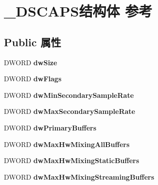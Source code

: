 \hypertarget{struct___d_s_c_a_p_s}{}\section{\+\_\+\+D\+S\+C\+A\+P\+S结构体 参考}
\label{struct___d_s_c_a_p_s}
\subsection*{Public 属性}
\begin{DoxyCompactItemize}
\item 
\mbox{\label{struct___d_s_c_a_p_s_acf5a8360a23ad3d2eb524d1cba1df331}} 
D\+W\+O\+RD {\bfseries dw\+Size}
\item 
\mbox{\label{struct___d_s_c_a_p_s_a06c7cb064cb8ec0e0dacb0757ada8b91}} 
D\+W\+O\+RD {\bfseries dw\+Flags}
\item 
\mbox{\label{struct___d_s_c_a_p_s_aa274d8c589981cf49dea4fcebbeb8398}} 
D\+W\+O\+RD {\bfseries dw\+Min\+Secondary\+Sample\+Rate}
\item 
\mbox{\label{struct___d_s_c_a_p_s_a3ab6dfd8a659338b0d6f871c5bfac77d}} 
D\+W\+O\+RD {\bfseries dw\+Max\+Secondary\+Sample\+Rate}
\item 
\mbox{\label{struct___d_s_c_a_p_s_a2cd5675747f68712d4851795b03b2ee8}} 
D\+W\+O\+RD {\bfseries dw\+Primary\+Buffers}
\item 
\mbox{\label{struct___d_s_c_a_p_s_aa76c898aabb19fb791def4a9e875c074}} 
D\+W\+O\+RD {\bfseries dw\+Max\+Hw\+Mixing\+All\+Buffers}
\item 
\mbox{\label{struct___d_s_c_a_p_s_ac7996b0871403cbedeafa3769130d951}} 
D\+W\+O\+RD {\bfseries dw\+Max\+Hw\+Mixing\+Static\+Buffers}
\item 
\mbox{\label{struct___d_s_c_a_p_s_a1323003e827ec18c2fd6e8703732be2c}} 
D\+W\+O\+RD {\bfseries dw\+Max\+Hw\+Mixing\+Streaming\+Buffers}
\item 
\mbox{\label{struct___d_s_c_a_p_s_ad012687c1fe6ebfad0eaba7e1fd72e24}} 

\end{DoxyCompactItemize}
